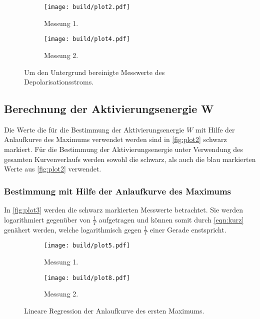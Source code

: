 \begin{figure}[H]
  \begin{subfigure}{\textwidth}
  \centering
  \texttt{[image: build/plot2.pdf]}
  \caption{Messung 1.}
  \label{fig:plot2a}
  \end{subfigure}
  \hfill
  \begin{subfigure}{\textwidth}
  \centering
  \texttt{[image: build/plot4.pdf]}
  \caption{Messung 2.}
  \label{fig:plot2b}
  \end{subfigure}
  \caption{Um den Untergrund bereinigte Messwerte des Depolarisationsstroms.}
  \label{fig:plot2}
\end{figure}



\subsection{Berechnung der Aktivierungsenergie W}
\label{subsec:Aktivierungsenergie}

Die Werte die für die Bestimmung der Aktivierungsenergie $W$ mit Hilfe der Anlaufkurve des Maximums verwendet werden sind in \autoref{fig:plot2}
schwarz markiert.
Für die Bestimmung der Aktivierungsenergie unter Verwendung des gesamten Kurvenverlaufs werden sowohl die schwarz, als auch die blau
markierten Werte aus \autoref{fig:plot2} verwendet.

\subsubsection{Bestimmung mit Hilfe der Anlaufkurve des Maximums}

In \autoref{fig:plot3} werden die schwarz markierten Messwerte betrachtet. Sie werden logarithmiert gegenüber von $\frac{1}{T}$ aufgetragen
und können somit durch \autoref{eqn:kurz} genähert werden, welche logarithmisch gegen $\frac{1}{T}$ einer Gerade enstspricht.

\begin{figure}[H]
  \begin{subfigure}{\textwidth}
  \centering
  \texttt{[image: build/plot5.pdf]}
  \caption{Messung 1.}
  \label{fig:plot3a}
  \end{subfigure}
  \hfill
  \begin{subfigure}{\textwidth}
  \centering
  \texttt{[image: build/plot8.pdf]}
  \caption{Messung 2.}
  \label{fig:plot3b}
  \end{subfigure}
  \caption{Lineare Regression der Anlaufkurve des ersten Maximums.}
  \label{fig:plot3}
\end{figure}

